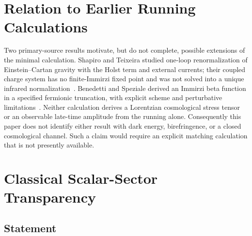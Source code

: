 \documentclass[aps,prd,twocolumn,superscriptaddress,showpacs,preprintnumbers,nofootinbib,longbibliography,floatfix]{revtex4-2}
\begin{document}
\section{Relation to Earlier Running Calculations}\label{sec:running_context}

Two primary-source results motivate, but do not complete, possible extensions
of the minimal calculation.  Shapiro and Teixeira studied one-loop
renormalization of Einstein--Cartan gravity with the Holst term and external
currents; their coupled charge system has no finite-Immirzi fixed point and was
not solved into a unique infrared normalization~\cite{ShapiroTeixeira2014}.
Benedetti and Speziale derived an Immirzi beta function in a specified
fermionic truncation, with explicit scheme and perturbative
limitations~\cite{BenedettiSpeziale2011run,Benedetti2011}.  Neither
calculation derives a Lorentzian cosmological stress tensor or an observable
late-time amplitude from the running alone.  Consequently this paper does not
identify either result with dark energy, birefringence, or a closed
cosmological channel.  Such a claim would require an explicit matching
calculation that is not presently available.

\section{Classical Scalar-Sector Transparency}\label{sec:transparency}

\subsection{Statement}
\end{document}
